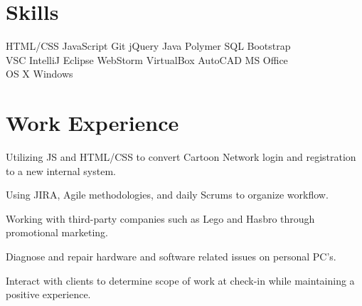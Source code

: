 \documentclass[]{deedy-resume-openfont}
\begin{document}
\begin{minipage}[t]{0.66\textwidth}


\section{Skills}
HTML/CSS \textbullet{} JavaScript \textbullet{} Git \textbullet{} jQuery \textbullet{} Java \textbullet{} Polymer \textbullet{} SQL \textbullet{} Bootstrap\\
VSC \textbullet{} IntelliJ \textbullet{} Eclipse \textbullet{} WebStorm \textbullet{} VirtualBox \textbullet{} AutoCAD \textbullet{} MS Office \\
OS X \textbullet{} Windows \\
\sectionsep


\section{Work Experience}

\vspace{\topsep} %
\begin{tightemize}
\item Utilizing JS and HTML/CSS to convert Cartoon Network login and registration to a new internal system.
\item Using JIRA, Agile methodologies, and daily Scrums to organize workflow.
\item Working with third-party companies such as Lego and Hasbro through promotional marketing.
\end{tightemize}
\sectionsep

\begin{tightemize}
\item Diagnose and repair hardware and software related issues on personal PC's.
\item Interact with clients to determine scope of work at check-in while maintaining a positive experience.
\end{tightemize}
\sectionsep


\end{minipage}
\end{document}
